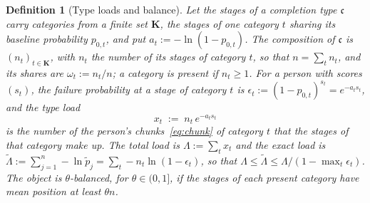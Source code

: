 \documentclass{article}
\newtheorem{definition}{Definition}
\begin{document}
\begin{definition}[Type loads and balance]\label{def:loads}
Let the stages of a completion type $\mathfrak{c}$ carry categories from a finite set $\mathbf{K}$, the stages of one category $t$ sharing its baseline probability $p_{0,t}$, and put $a_t := -\ln(1 - p_{0,t})$. The \emph{composition} of $\mathfrak{c}$ is $(n_t)_{t \in \mathbf{K}}$, with $n_t$ the number of its stages of category $t$, so that $n = \sum_t n_t$, and its \emph{shares} are $\omega_t := n_t/n$; a category is \emph{present} if $n_t \geq 1$. For a person with scores $(s_t)$, the failure probability at a stage of category $t$ is $\epsilon_t := (1 - p_{0,t})^{s_t} = e^{-a_t s_t}$, and the \emph{type load}
\begin{equation}\label{eq:typeload}
  x_t \;:=\; n_t\,e^{-a_t s_t}
\end{equation}
is the number of the person's chunks~\eqref{eq:chunk} of category $t$ that the stages of that category make up. The \emph{total load} is $\Lambda := \sum_t x_t$ and the \emph{exact load} is $\widetilde{\Lambda} := \sum_{j=1}^{n} -\ln\widetilde{p}_j = \sum_t -n_t\ln(1 - \epsilon_t)$, so that $\Lambda \leq \widetilde{\Lambda} \leq \Lambda/(1 - \max_t\epsilon_t)$. The object is \emph{$\theta$-balanced}, for $\theta \in (0, 1]$, if the stages of each present category have mean position at least $\theta n$.
\end{definition}
\end{document}
